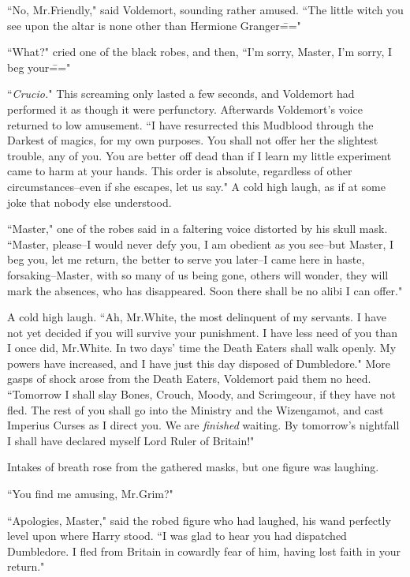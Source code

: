 ``No, Mr.\?Friendly," said Voldemort, sounding rather amused. ``The little witch you see upon the altar is none other than Hermione Granger\==="

``What?" cried one of the black robes, and then, ``I'm sorry, Master, I'm sorry, I beg your\==="

``\emph{Crucio.}" This screaming only lasted a few seconds, and Voldemort had performed it as though it were perfunctory. Afterwards Voldemort's voice returned to low amusement. ``I have resurrected this Mudblood through the Darkest of magics, for my own purposes. You shall not offer her the slightest trouble, any of you. You are better off dead than if I learn my little experiment came to harm at your hands. This order is absolute, regardless of other circumstances\---even if she escapes, let us say." A cold high laugh, as if at some joke that nobody else understood.

``Master," one of the robes said in a faltering voice distorted by his skull mask. ``Master, please\---I would never defy you, I am obedient as you see\---but Master, I beg you, let me return, the better to serve you later\---I came here in haste, forsaking\---Master, with so many of us being gone, others will wonder, they will mark the absences, who has disappeared. Soon there shall be no alibi I can offer."

A cold high laugh. ``Ah, Mr.\?White, the most delinquent of my servants. I have not yet decided if you will survive your punishment. I have less need of you than I once did, Mr.\?White. In two days' time the Death Eaters shall walk openly. My powers have increased, and I have just this day disposed of Dumbledore." More gasps of shock arose from the Death Eaters, Voldemort paid them no heed. ``Tomorrow I shall slay Bones, Crouch, Moody, and Scrimgeour, if they have not fled. The rest of you shall go into the Ministry and the Wizengamot, and cast Imperius Curses as I direct you. We are \emph{finished} waiting. By tomorrow's nightfall I shall have declared myself Lord Ruler of Britain!"

Intakes of breath rose from the gathered masks, but one figure was laughing.

``You find me amusing, Mr.\?Grim?"

``Apologies, Master," said the robed figure who had laughed, his wand perfectly level upon where Harry stood. ``I was glad to hear you had dispatched Dumbledore. I fled from Britain in cowardly fear of him, having lost faith in your return."

